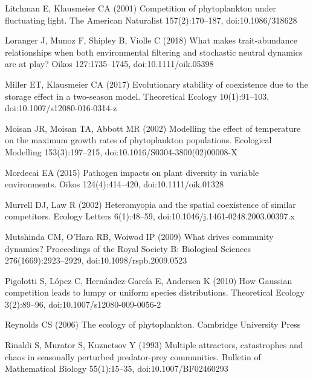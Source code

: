 \documentclass[a4paper,12pt]{article}
\begin{document}
\begin{thebibliography}{68}
Litchman E, Klausmeier CA (2001) Competition of phytoplankton under fluctuating
  light. The American Naturalist 157(2):170--187, doi:{10.1086/318628}

Loranger J, Munoz F, Shipley B, Violle C (2018) What makes trait-abundance
  relationships when both environmental filtering and stochastic neutral
  dynamics are at play? Oikos 127:1735--1745, doi:{10.1111/oik.05398}

Miller ET, Klausmeier CA (2017) Evolutionary stability of coexistence due to
  the storage effect in a two-season model. Theoretical Ecology 10(1):91--103,
  doi:{10.1007/s12080-016-0314-z}

Moisan JR, Moisan TA, Abbott MR (2002) Modelling the effect of temperature on
  the maximum growth rates of phytoplankton populations. Ecological Modelling
  153(3):197--215, doi:{10.1016/S0304-3800(02)00008-X}

Mordecai EA (2015) Pathogen impacts on plant diversity in variable
  environments. Oikos 124(4):414--420, doi:{10.1111/oik.01328}

Murrell DJ, Law R (2002) Heteromyopia and the spatial coexistence of similar
  competitors. Ecology Letters 6(1):48--59,
  doi:{10.1046/j.1461-0248.2003.00397.x}

Mutshinda CM, O'Hara RB, Woiwod IP (2009) What drives community dynamics?
  Proceedings of the Royal Society B: Biological Sciences 276(1669):2923--2929,
  doi:{10.1098/rspb.2009.0523}

Pigolotti S, L\'{o}pez C, Hern\'{a}ndez-Garc\'{i}a E, Andersen K (2010) How
  {Gaussian} competition leads to lumpy or uniform species distributions.
  Theoretical Ecology 3(2):89--96, doi:{10.1007/s12080-009-0056-2}

Reynolds CS (2006) The ecology of phytoplankton. Cambridge University Press

Rinaldi S, Murator S, Kuznetsov Y (1993) Multiple attractors, catastrophes and
  chaos in seasonally perturbed predator-prey communities. Bulletin of
  Mathematical Biology 55(1):15--35, doi:{10.1007/BF02460293}


\end{thebibliography}
\end{document}
